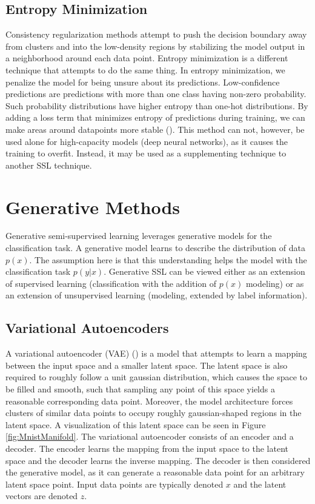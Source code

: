 \subsection{Entropy Minimization}
\label{sec:EntropyMinimization}

Consistency regularization methods attempt to push the decision boundary away from clusters and into the low-density regions by stabilizing the model output in a neighborhood around each data point. Entropy minimization is a different technique that attempts to do the same thing. In entropy minimization, we penalize the model for being unsure about its predictions. Low-confidence predictions are predictions with more than one class having non-zero probability. Such probability distributions have higher entropy than one-hot distributions. By adding a loss term that minimizes entropy of predictions during training, we can make areas around datapoints more stable (\cite{EntropyMinimization}). This method can not, however, be used alone for high-capacity models (deep neural networks), as it causes the training to overfit. Instead, it may be used as a supplementing technique to another SSL technique.


\section{Generative Methods}
\label{sec:GenerativeSslMethods}

Generative semi-supervised learning leverages generative models for the classification task. A generative model learns to describe the distribution of data $p(x)$. The assumption here is that this understanding helps the model with the classification task $p(y|x)$. Generative SSL can be viewed either as an extension of supervised learning (classification with the addition of $p(x)$ modeling) or as an extension of unsupervised learning (modeling, extended by label information).


\subsection{Variational Autoencoders}

A variational autoencoder (VAE) (\cite{VariationalAutoencoder}) is a model that attempts to learn a mapping between the input space and a smaller latent space. The latent space is also required to roughly follow a unit gaussian distribution, which causes the space to be filled and smooth, such that sampling any point of this space yields a reasonable corresponding data point. Moreover, the model architecture forces clusters of similar data points to occupy roughly gaussian-shaped regions in the latent space. A visualization of this latent space can be seen in Figure \ref{fig:MnistManifold}. The variational autoencoder consists of an encoder and a decoder. The encoder learns the mapping from the input space to the latent space and the decoder learns the inverse mapping. The decoder is then considered the generative model, as it can generate a reasonable data point for an arbitrary latent space point. Input data points are typically denoted $x$ and the latent vectors are denoted $z$.

